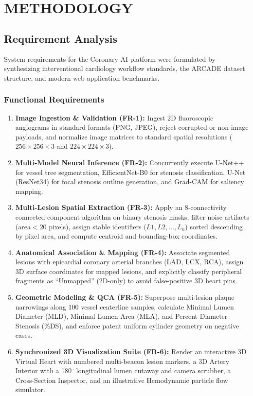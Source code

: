 \chapter{METHODOLOGY}

\section{Requirement Analysis}
System requirements for the Coronary AI platform were formulated by synthesizing interventional cardiology workflow standards, the ARCADE dataset structure, and modern web application benchmarks.

\subsection{Functional Requirements}
\begin{enumerate}
    \item \textbf{Image Ingestion \& Validation (FR-1):} Ingest 2D fluoroscopic angiograms in standard formats (PNG, JPEG), reject corrupted or non-image payloads, and normalize image matrices to standard spatial resolutions ($256 \times 256 \times 3$ and $224 \times 224 \times 3$).
    \item \textbf{Multi-Model Neural Inference (FR-2):} Concurrently execute U-Net++ for vessel tree segmentation, EfficientNet-B0 for stenosis classification, U-Net (ResNet34) for focal stenosis outline generation, and Grad-CAM for saliency mapping.
    \item \textbf{Multi-Lesion Spatial Extraction (FR-3):} Apply an 8-connectivity connected-component algorithm on binary stenosis masks, filter noise artifacts ($\text{area} < 20$ pixels), assign stable identifiers ($L1, L2, \dots, L_n$) sorted descending by pixel area, and compute centroid and bounding-box coordinates.
    \item \textbf{Anatomical Association \& Mapping (FR-4):} Associate segmented lesions with epicardial coronary arterial branches (LAD, LCX, RCA), assign 3D surface coordinates for mapped lesions, and explicitly classify peripheral fragments as ``Unmapped'' (2D-only) to avoid false-positive 3D heart pins.
    \item \textbf{Geometric Modeling \& QCA (FR-5):} Superpose multi-lesion plaque narrowings along 100 vessel centerline samples, calculate Minimal Lumen Diameter (MLD), Minimal Lumen Area (MLA), and Percent Diameter Stenosis (\%DS), and enforce patent uniform cylinder geometry on negative cases.
    \item \textbf{Synchronized 3D Visualization Suite (FR-6):} Render an interactive 3D Virtual Heart with numbered multi-beacon lesion markers, a 3D Artery Interior with a 180$^\circ$ longitudinal lumen cutaway and camera scrubber, a Cross-Section Inspector, and an illustrative Hemodynamic particle flow simulator.

\end{enumerate}
